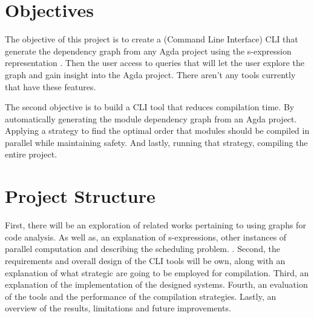 \section{Objectives}

The objective of this project is to create a (Command Line Interface) CLI that
generate the dependency graph from any Agda project using the s-expression
representation \cite{andrej}. Then the user access to queries that will let the
user explore the graph and gain insight into the Agda project. There aren't
any tools currently that have these features. 

The second objective is to build a CLI tool that reduces compilation time. By
automatically generating the module dependency graph from an Agda project.
Applying a strategy to find the optimal order that modules should be compiled
in parallel while maintaining safety. And lastly, running that strategy,
compiling the entire project.

\section{Project Structure}

First, there will be an exploration of related works pertaining to using graphs
for code analysis. As well as, an explanation of s-expressions, other instances
of parallel computation and describing the scheduling problem. . Second, the requirements
and overall design of the CLI tools will be own, along with an explanation of
what strategic are going to be employed for compilation. Third, an explanation
of the implementation of the designed systems. Fourth, an evaluation of the
tools and the performance of the compilation strategies. Lastly, an overview of
the results, limitations and future improvements.
